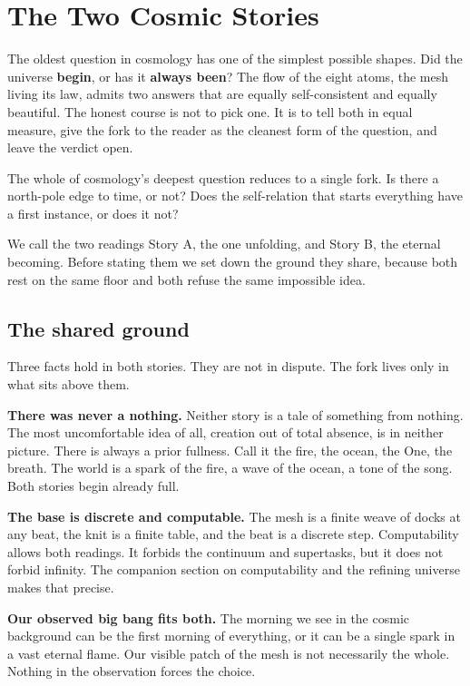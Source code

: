 \section{The Two Cosmic Stories}

The oldest question in cosmology has one of the simplest possible shapes. Did the universe \textbf{begin}, or has it \textbf{always been}? The flow of the eight atoms, the mesh living its law, admits two answers that are equally self-consistent and equally beautiful. The honest course is not to pick one. It is to tell both in equal measure, give the fork to the reader as the cleanest form of the question, and leave the verdict open.

\begin{principle}
The whole of cosmology's deepest question reduces to a single fork. Is there a north-pole edge to time, or not? Does the self-relation that starts everything have a first instance, or does it not?
\end{principle}

We call the two readings Story A, the one unfolding, and Story B, the eternal becoming. Before stating them we set down the ground they share, because both rest on the same floor and both refuse the same impossible idea.

\subsection{The shared ground}

Three facts hold in both stories. They are not in dispute. The fork lives only in what sits above them.

\textbf{There was never a nothing.} Neither story is a tale of something from nothing. The most uncomfortable idea of all, creation out of total absence, is in neither picture. There is always a prior fullness. Call it the fire, the ocean, the One, the breath. The world is a spark of the fire, a wave of the ocean, a tone of the song. Both stories begin already full.

\textbf{The base is discrete and computable.} The mesh is a finite weave of docks at any beat, the knit is a finite table, and the beat is a discrete step. Computability allows both readings. It forbids the continuum and supertasks, but it does not forbid infinity. The companion section on computability and the refining universe makes that precise.

\textbf{Our observed big bang fits both.} The morning we see in the cosmic background can be the first morning of everything, or it can be a single spark in a vast eternal flame. Our visible patch of the mesh is not necessarily the whole. Nothing in the observation forces the choice.


